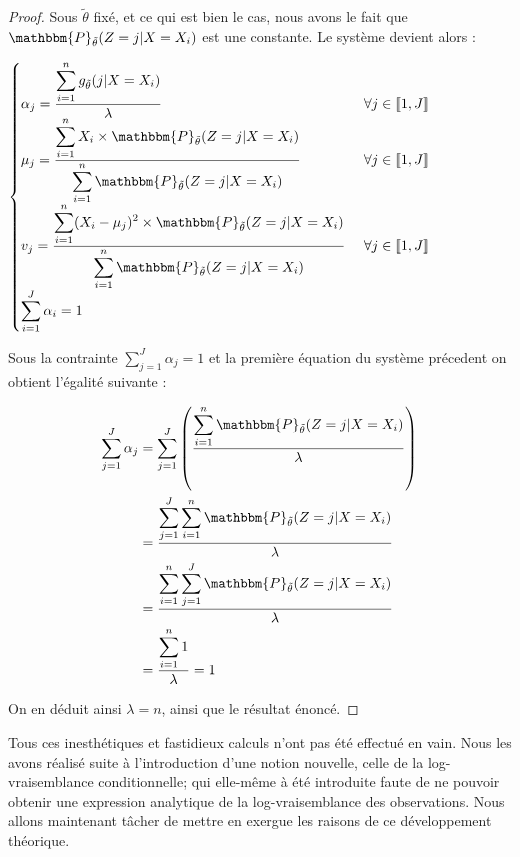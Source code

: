 \documentclass[frenchb]{report}
\newcommand{\1}{\mathbbm{1}}
\newcommand{\prob}{\mathbbm{P}}
\newcommand{\thetat}{\tilde{\theta}}
\theoremstyle{definition}\newtheorem{defn}{Définition}
\theoremstyle{definition}\newtheorem{exm}{Exemple}
\theoremstyle{definition}\newtheorem{nota}{Notation}
\theoremstyle{definition}\newtheorem{rem}{Remarque}
\begin{document}
\begin{proof}
Sous $\thetat$ fixé, et ce qui est bien le cas, nous avons le fait que $\prob_{\thetat}(Z=j|X=X_i)$ est une constante. 
Le système devient alors :

$
\begin{cases}
\alpha_j =\displaystyle \frac{\displaystyle\sum_{i=1}^n g_{\thetat}(j|X=X_i)}{\lambda} &\text{ } \forall j \in \llbracket 1,J \rrbracket \\
\mu_j =\displaystyle \frac{\displaystyle\sum_{i=1}^n X_i\times\prob_{\thetat}(Z=j|X=X_i)}{\displaystyle\sum_{i=1}^n \prob_{\thetat}(Z=j|X=X_i)} &\text{ } \forall j \in \llbracket 1,J \rrbracket \\
v_j = \displaystyle\frac{\displaystyle\sum_{i=1}^n (X_i -\mu_j)^2 \times\prob_{\thetat}(Z=j|X=X_i)}{\displaystyle\displaystyle\sum_{i=1}^n\prob_{\thetat}(Z=j|X=X_i)} &\text{ } \forall j \in \llbracket 1,J \rrbracket \\
\displaystyle\sum_{i=1}^J\alpha_i =1 
\end{cases}
$

Sous la contrainte $\displaystyle\sum_{j=1}^J\alpha_j =1$ et la première équation du système précedent on obtient l'égalité suivante : 

\begin{align*}
\sum_{j=1}^J\alpha_j &= \sum_{j=1}^J \left(\frac{\displaystyle\sum_{i=1}^n \prob_{\thetat}(Z=j|X=X_i)}{\lambda}\right)\\
&=\displaystyle\frac{\displaystyle\sum_{j=1}^J \sum_{i=1}^n \prob_{\thetat}(Z=j|X=X_i)}{\lambda}\\
&=\displaystyle\frac{\displaystyle\sum_{i=1}^n \sum_{j=1}^J \prob_{\thetat}(Z=j|X=X_i)}{\lambda}\\
&=\displaystyle\frac{\displaystyle\sum_{i=1}^n 1}{\lambda}= 1\\
\end{align*}

On en déduit ainsi $\lambda = n$, ainsi que le résultat énoncé.
\end{proof}


Tous ces inesthétiques et fastidieux calculs n'ont pas été effectué en vain. Nous les avons réalisé suite à l'introduction d'une notion nouvelle, celle de la log-vraisemblance conditionnelle; qui elle-même à été introduite faute de ne pouvoir obtenir une expression analytique de la log-vraisemblance des observations. Nous allons maintenant tâcher de mettre en exergue les raisons de ce développement théorique.

\pagebreak
\end{document}
